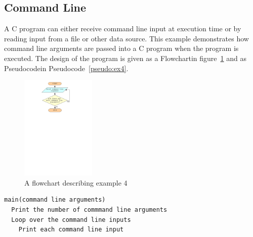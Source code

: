\documentclass[11pt]{scrartcl}
\def\psc{Pseudocode}
\def\flo{Flowchart}
\begin{document}
\subsection{Command Line}
A C program can either receive command line input at execution time or
by reading input from a file or other data source.  This example
demonstrates how command line arguments are passed into a C program
when the program is executed.  The design of the program is given as a
\flo in figure~\ref{figure:flowchart_ex4} and as \psc in
\psc~\ref{pseudo:ex4}. 

\begin{figure}[h]
\begin{center}
\includegraphics[height=5cm]{figures/ex4}
\caption{A flowchart describing example 4
\label{figure:flowchart_ex4}}
\end{center}
\end{figure}

\begin{pseudocode}[h]
\begin{verbatim}
main(command line arguments)
  Print the number of commmand line arguments
  Loop over the command line inputs
    Print each command line input
\end{verbatim}
\caption{Example 4 in pseudocode \label{pseudo:ex4}}
\end{pseudocode}
\end{document}
